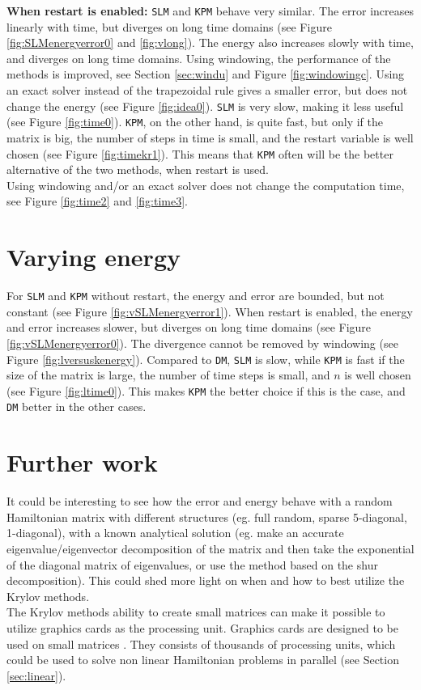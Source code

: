 \noindent \textbf{When restart is enabled:} \texttt{SLM} and \texttt{KPM} behave very similar. The error increases linearly with time, but diverges on long time domains (see Figure \ref{fig:SLMenergyerror0} and \ref{fig:vlong}). The energy also increases slowly with time, and diverges on long time domains. Using windowing, the performance of the methods is improved, see Section \ref{sec:windu} and Figure \ref{fig:windowingc}. Using an exact solver instead of the trapezoidal rule gives a smaller error, but does not change the energy (see Figure \ref{fig:idea0}). \texttt{SLM} is very slow, making it less useful  (see Figure \ref{fig:time0}). \texttt{KPM}, on the other hand, is quite fast, but only if the matrix is big, the number of steps in time is small, and the restart variable is well chosen (see Figure \ref{fig:timekr1}). This means that \texttt{KPM} often will be the better alternative of the two methods, when restart is used. \\

\noindent Using windowing and/or an exact solver does not change the computation time, see Figure \ref{fig:time2} and \ref{fig:time3}.
\section{Varying energy} %
\label{sec:Konkvari}

For \texttt{SLM} and \texttt{KPM} without restart, the energy and error are bounded, but not constant (see Figure \ref{fig:vSLMenergyerror1}). When restart is enabled, the energy and error increases slower, but diverges on long time domains (see Figure \ref{fig:vSLMenergyerror0}). The divergence cannot be removed by windowing (see Figure \ref{fig:lversuskenergy}). Compared to \texttt{DM}, \texttt{SLM} is slow, while \texttt{KPM} is fast if the size of the matrix is large, the number of time steps is small, and $n$ is well chosen (see Figure \ref{fig:ltime0}). This makes \texttt{KPM} the better choice if this is the case, and \texttt{DM} better in the other cases.

\section{Further work}
It could be interesting to see how the error and energy behave with a random Hamiltonian matrix with different structures (eg. full random, sparse 5-diagonal, 1-diagonal), with a known analytical solution (eg. make an accurate eigenvalue/eigenvector decomposition of the matrix and then take the exponential of the diagonal matrix of eigenvalues, or use the method based on the shur decomposition).
This could shed more light on when and how to best utilize the Krylov methods.\\

\noindent The Krylov methods ability to create small matrices can make it possible to utilize graphics cards as the processing unit. Graphics cards are designed to be used on small matrices \cite{graphics}. They consists of thousands of processing units, which could be used to solve non linear Hamiltonian problems in parallel (see Section \ref{sec:linear}).
